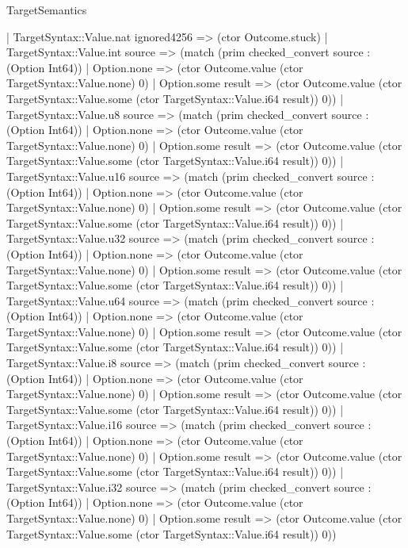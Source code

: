 \begin{lexlean}{TargetSemantics}
\begin{semanticmodule}
{            | TargetSyntax::Value.nat ignored4256 => (ctor Outcome.stuck)
            | TargetSyntax::Value.int source => (match (prim checked_convert source : (Option Int64))
              | Option.none => (ctor Outcome.value (ctor TargetSyntax::Value.none) 0)
              | Option.some result => (ctor Outcome.value (ctor TargetSyntax::Value.some (ctor TargetSyntax::Value.i64 result)) 0))
            | TargetSyntax::Value.u8 source => (match (prim checked_convert source : (Option Int64))
              | Option.none => (ctor Outcome.value (ctor TargetSyntax::Value.none) 0)
              | Option.some result => (ctor Outcome.value (ctor TargetSyntax::Value.some (ctor TargetSyntax::Value.i64 result)) 0))
            | TargetSyntax::Value.u16 source => (match (prim checked_convert source : (Option Int64))
              | Option.none => (ctor Outcome.value (ctor TargetSyntax::Value.none) 0)
              | Option.some result => (ctor Outcome.value (ctor TargetSyntax::Value.some (ctor TargetSyntax::Value.i64 result)) 0))
            | TargetSyntax::Value.u32 source => (match (prim checked_convert source : (Option Int64))
              | Option.none => (ctor Outcome.value (ctor TargetSyntax::Value.none) 0)
              | Option.some result => (ctor Outcome.value (ctor TargetSyntax::Value.some (ctor TargetSyntax::Value.i64 result)) 0))
            | TargetSyntax::Value.u64 source => (match (prim checked_convert source : (Option Int64))
              | Option.none => (ctor Outcome.value (ctor TargetSyntax::Value.none) 0)
              | Option.some result => (ctor Outcome.value (ctor TargetSyntax::Value.some (ctor TargetSyntax::Value.i64 result)) 0))
            | TargetSyntax::Value.i8 source => (match (prim checked_convert source : (Option Int64))
              | Option.none => (ctor Outcome.value (ctor TargetSyntax::Value.none) 0)
              | Option.some result => (ctor Outcome.value (ctor TargetSyntax::Value.some (ctor TargetSyntax::Value.i64 result)) 0))
            | TargetSyntax::Value.i16 source => (match (prim checked_convert source : (Option Int64))
              | Option.none => (ctor Outcome.value (ctor TargetSyntax::Value.none) 0)
              | Option.some result => (ctor Outcome.value (ctor TargetSyntax::Value.some (ctor TargetSyntax::Value.i64 result)) 0))
            | TargetSyntax::Value.i32 source => (match (prim checked_convert source : (Option Int64))
              | Option.none => (ctor Outcome.value (ctor TargetSyntax::Value.none) 0)
              | Option.some result => (ctor Outcome.value (ctor TargetSyntax::Value.some (ctor TargetSyntax::Value.i64 result)) 0))
}
\end{semanticmodule}
\end{lexlean}
